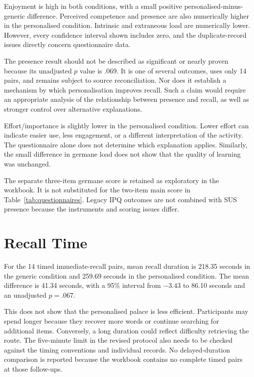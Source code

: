 Enjoyment is high in both conditions, with a small positive personalised-minus-generic difference. Perceived competence and presence are also numerically higher in the personalised condition. Intrinsic and extraneous load are numerically lower. However, every confidence interval shown includes zero, and the duplicate-record issues directly concern questionnaire data.

The presence result should not be described as significant or nearly proven because its unadjusted $p$ value is .069. It is one of several outcomes, uses only 14 pairs, and remains subject to source reconciliation. Nor does it establish a mechanism by which personalisation improves recall. Such a claim would require an appropriate analysis of the relationship between presence and recall, as well as stronger control over alternative explanations.

Effort/importance is slightly lower in the personalised condition. Lower effort can indicate easier use, less engagement, or a different interpretation of the activity. The questionnaire alone does not determine which explanation applies. Similarly, the small difference in germane load does not show that the quality of learning was unchanged.

The separate three-item germane score is retained as exploratory in the workbook. It is not substituted for the two-item main score in Table~\ref{tab:questionnaires}. Legacy IPQ outcomes are not combined with SUS presence because the instruments and scoring issues differ.

\section{Recall Time}
For the 14 timed immediate-recall pairs, mean recall duration is 218.35 seconds in the generic condition and 259.69 seconds in the personalised condition. The mean difference is 41.34 seconds, with a 95\% interval from $-3.43$ to 86.10 seconds and an unadjusted $p=.067$.

This does not show that the personalised palace is less efficient. Participants may spend longer because they recover more words or continue searching for additional items. Conversely, a long duration could reflect difficulty retrieving the route. The five-minute limit in the revised protocol also needs to be checked against the timing conventions and individual records. No delayed-duration comparison is reported because the workbook contains no complete timed pairs at those follow-ups.

